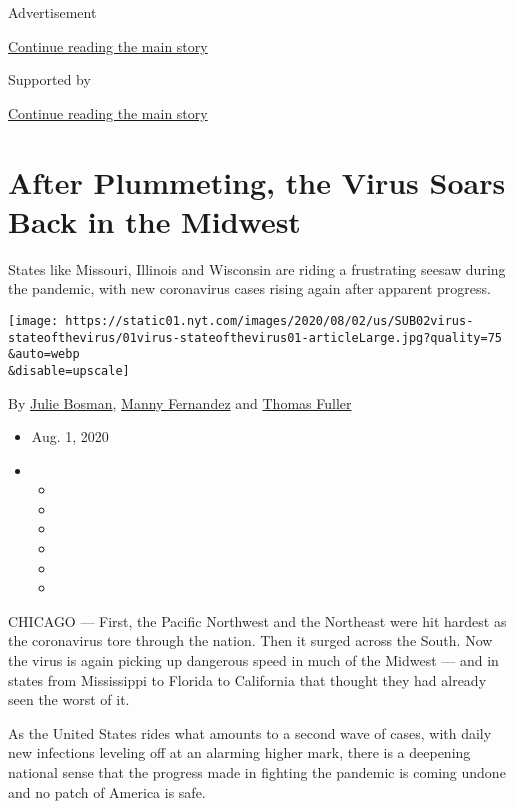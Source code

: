 Advertisement

\protect\hyperlink{after-top}{Continue reading the main story}

Supported by

\protect\hyperlink{after-sponsor}{Continue reading the main story}

\hypertarget{after-plummeting-the-virus-soars-back-in-the-midwest}{%
\section{After Plummeting, the Virus Soars Back in the
Midwest}\label{after-plummeting-the-virus-soars-back-in-the-midwest}}

States like Missouri, Illinois and Wisconsin are riding a frustrating
seesaw during the pandemic, with new coronavirus cases rising again
after apparent progress.

\texttt{[image: https://static01.nyt.com/images/2020/08/02/us/SUB02virus-stateofthevirus/01virus-stateofthevirus01-articleLarge.jpg?quality=75\\\&auto=webp\\\&disable=upscale]}

By \href{https://www.nytimes.com/by/julie-bosman}{Julie Bosman},
\href{https://www.nytimes.com/by/manny-fernandez}{Manny Fernandez} and
\href{https://www.nytimes.com/by/thomas-fuller}{Thomas Fuller}

\begin{itemize}
\item
  Aug. 1, 2020
\item
  \begin{itemize}
  \item
  \item
  \item
  \item
  \item
  \item
  \end{itemize}
\end{itemize}

CHICAGO --- First, the Pacific Northwest and the Northeast were hit
hardest as the coronavirus tore through the nation. Then it surged
across the South. Now the virus is again picking up dangerous speed in
much of the Midwest --- and in states from Mississippi to Florida to
California that thought they had already seen the worst of it.

As the United States rides what amounts to a second wave of cases, with
daily new infections leveling off at an alarming higher mark, there is a
deepening national sense that the progress made in fighting the pandemic
is coming undone and no patch of America is safe.

